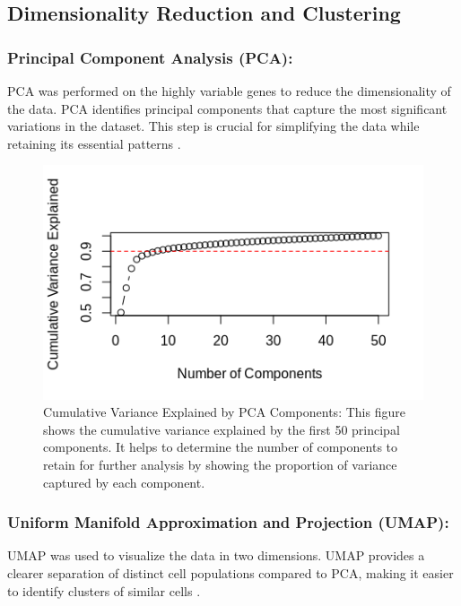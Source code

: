 \documentclass[runningheads]{llncs}
\begin{document}
\subsection*{Dimensionality Reduction and Clustering}
\subsubsection{Principal Component Analysis (PCA):} PCA was performed on the highly variable genes to reduce the dimensionality of the data. PCA identifies principal components that capture the most significant variations in the dataset. This step is crucial for simplifying the data while retaining its essential patterns \cite{nayak2021hitchhiker}.

\begin{figure}[htbp]
\centering
\includegraphics[height=0.2\textheight, width=\textwidth]{000012.png}
\caption{Cumulative Variance Explained by PCA Components: This figure shows the cumulative variance explained by the first 50 principal components. It helps to determine the number of components to retain for further analysis by showing the proportion of variance captured by each component.}
\label{fig_variance}
\end{figure}

\subsubsection{Uniform Manifold Approximation and Projection (UMAP):} UMAP was used to visualize the data in two dimensions. UMAP provides a clearer separation of distinct cell populations compared to PCA, making it easier to identify clusters of similar cells \cite{qiu2017reversed}.
\end{document}
